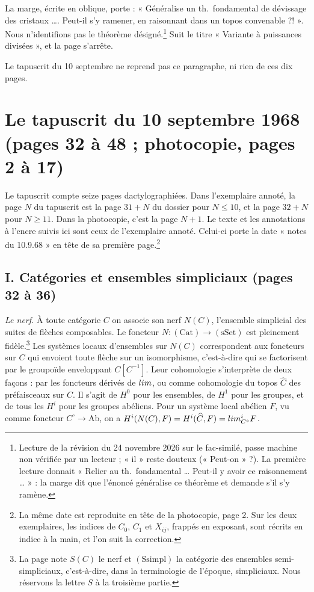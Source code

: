 \documentclass[11pt,a4paper]{article}
\begin{document}
La marge, écrite en oblique, porte : « Généralise un th.\ fondamental de
dévissage des cristaux …. Peut-il s'y ramener, en raisonnant dans un topos
convenable ?! ». Nous n'identifions pas le théorème désigné.\footnote{Lecture
de la révision du 24 novembre 2026 sur le fac-similé, passe machine non
vérifiée par un lecteur ; « il » reste douteux (« Peut-on » ?). La première
lecture donnait « Relier au th.\ fondamental … Peut-il y avoir ce raisonnement
… » : la marge dit que l'énoncé généralise ce théorème et demande s'il s'y
ramène.} Suit le titre « Variante à
puissances divisées », et la page s'arrête.

Le tapuscrit du 10 septembre ne reprend pas ce paragraphe, ni rien de ces dix
pages.

\section*{Le tapuscrit du 10 septembre 1968 (pages 32 à 48 ; photocopie, pages 2 à 17)}

Le tapuscrit compte seize pages dactylographiées. Dans l'exemplaire annoté, la
page $N$ du tapuscrit est la page $31 + N$ du dossier pour $N \leq 10$, et la
page $32 + N$ pour $N \geq 11$. Dans la photocopie, c'est la page $N + 1$. Le
texte et les annotations à l'encre suivis ici sont ceux de l'exemplaire annoté.
Celui-ci porte la date « notes du 10.9.68 » en tête de sa première
page.\footnote{La même date est reproduite en tête de la photocopie, page 2.
Sur les deux exemplaires, les indices de $C_0$, $C_1$ et $X_{ij}$, frappés en
exposant, sont récrits en indice à la main, et l'on suit la correction.}

\subsection*{I. Catégories et ensembles simpliciaux (pages 32 à 36)}

\emph{Le nerf.} À toute catégorie $C$ on associe son nerf $N(C)$, l'ensemble
simplicial des suites de flèches composables. Le foncteur $N :
(\mathrm{Cat}) \to (\mathrm{sSet})$ est pleinement fidèle.\footnote{La page note
$S(C)$ le nerf et $(\mathrm{Ssimpl})$ la catégorie des ensembles
semi-simpliciaux, c'est-à-dire, dans la terminologie de l'époque, simpliciaux.
Nous réservons la lettre $S$ à la troisième partie.} Les systèmes locaux
d'ensembles sur $N(C)$ correspondent aux foncteurs sur $C$ qui envoient toute
flèche sur un isomorphisme, c'est-à-dire qui se factorisent par le groupoïde
enveloppant $C[C^{-1}]$. Leur cohomologie s'interprète de deux façons : par les
foncteurs dérivés de $\varprojlim$, ou comme cohomologie du topos $\widehat{C}$
des préfaisceaux sur $C$. Il s'agit de $H^{0}$ pour les ensembles, de $H^{1}$
pour les groupes, et de tous les $H^{i}$ pour les groupes abéliens. Pour un
système local abélien $F$, vu comme foncteur $C^{\circ} \to \mathrm{Ab}$, on a
$H^{i}(N(C), F) = H^{i}(\widehat{C}, F) = \varprojlim^{i}_{C^{\circ}} F$.
\end{document}
